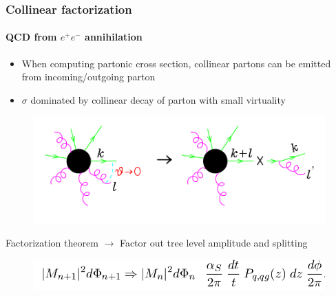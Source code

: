 \documentclass[aspectratio=43]{beamer}
\begin{document}
\begin{frame}


\end{frame}

\begin{frame}

	\frametitle{Collinear factorization}
	\framesubtitle{QCD from $e^{+}e^{-}$ annihilation}
	
	\begin{itemize} 
		\item When computing partonic cross section, collinear partons can be emitted from incoming/outgoing parton
		\item $\sigma$ dominated by collinear decay of parton with small virtuality
	\end{itemize}

	\begin{figure}
		\includegraphics[width = 7 cm]{plots/collinear_factorization.png}
	\end{figure}

	Factorization theorem $\longrightarrow$ Factor out tree level amplitude and splitting
	\begin{figure}
	\includegraphics[width = 8 cm]{plots/eq_factorization_theorem.png}
	\end{figure}
	
\end{frame}
\end{document}

